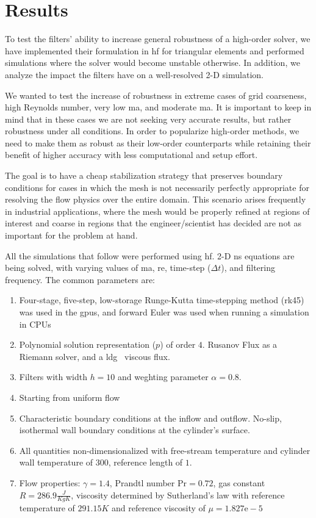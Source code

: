 \section{Results}
\label{sec:results}
To test the filters' ability to increase general robustness of a high-order solver, we have implemented their formulation in \gls{hf} for triangular elements and performed simulations where the solver would become unstable otherwise. In addition, we analyze the impact the filters have on a well-resolved 2-D simulation.

We wanted to test the increase of robustness in extreme cases of grid coarseness, high Reynolds number, very low \gls{ma}, and moderate \gls{ma}. It is important to keep in mind that in these cases we are not seeking very accurate results, but rather robustness under all conditions. In order to popularize high-order methods, we need to make them as robust as their low-order counterparts while retaining their benefit of higher accuracy with less computational and setup effort.

The goal is to have a cheap stabilization strategy that preserves boundary conditions for cases in which the mesh is not necessarily perfectly appropriate for resolving the flow physics over the entire domain. This scenario arises frequently in industrial applications, where the mesh would be properly refined at regions of interest and coarse in regions that the engineer/scientist has decided are not as important for the problem at hand.

All the simulations that follow were performed using \gls{hf}\cite{lopez2014verification}. 2-D \gls{ns} equations are being solved, with varying values of \gls{ma}, \gls{re}, time-step ($\Delta t$), and filtering frequency. The common parameters are:
\begin{enumerate}[1.]
\item Four-stage, five-step, low-storage Runge-Kutta time-stepping method (\gls{rk45}) \cite{carpenter1994fourth} was used in the \gls{gpu}s, and forward Euler was used when running a simulation in CPUs
\item Polynomial solution representation ($p$) of order $4$. Rusanov Flux as a Riemann solver, and a \gls{ldg}~\cite{cockburn1998local} viscous flux.
\item Filters with width $h = 10$ and weghting parameter $\alpha = 0.8$.
\item Starting from uniform flow
\item Characteristic boundary conditions at the inflow and outflow. No-slip, isothermal wall boundary conditions at the cylinder's surface.
\item All quantities non-dimensionalized with free-stream temperature and cylinder wall temperature of $300$, reference length of $1$.
\item Flow properties: $\gamma = 1.4$, Prandtl number $\mathrm{Pr} = 0.72$, gas constant $R = 286.9 \frac{J}{Kg K}$, viscosity determined by Sutherland's law with reference temperature of $291.15 K$ and reference viscosity of $\mu = 1.827\mathrm{e}-5$
\end{enumerate}

